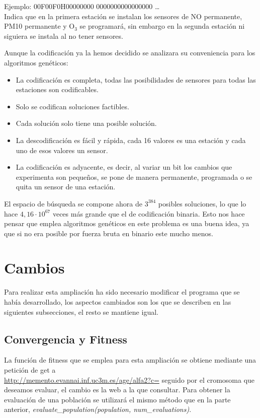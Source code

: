 \documentclass[12pt, spanish, pdftex]{UC3M_document}
\begin{document}
Ejemplo: 00F00F0H00000000 0000000000000000 … \\ Indica que en la primera estación se instalan los sensores de NO permanente, PM10 permanente y O$_3$ se programará, sin embargo en la segunda estación ni siguiera se instala al no tener sensores.

Aunque la codificación ya la hemos decidido se analizara su conveniencia para los algoritmos genéticos:
\begin{itemize}
	\item La codificación es completa, todas las posibilidades de sensores para todas las estaciones son codificables.
	\item Solo se codifican soluciones factibles.
	\item Cada solución solo tiene una posible solución.
	\item La descodificación es fácil y rápida, cada 16 valores es una estación y cada uno de esos valores un sensor.
	\item La codificación es adyacente, es decir, al variar un bit los cambios que experimenta son pequeños, se pone de manera permanente, programada o se quita un sensor de una estación.
\end{itemize}

El espacio de búsqueda se compone ahora de $3^{384}$ posibles soluciones, lo que lo hace $4,16 \cdot 10^{67}$ veces más grande que el de codificación binaria. Esto nos hace pensar que emplea algoritmos genéticos en este problema es una buena idea, ya que si no era posible por fuerza bruta en binario este mucho menos.

\section{Cambios}
Para realizar esta ampliación ha sido necesario modificar el programa que se había desarrollado, los aspectos cambiados son los que se describen en las siguientes subsecciones, el resto se mantiene igual.

\subsection{Convergencia y Fitness}
La función de fitness que se emplea para esta ampliación se obtiene mediante una petición de get a \\ \href{http://memento.evannai.inf.uc3m.es/age/alfa2?c=}{http://memento.evannai.inf.uc3m.es/age/alfa2?c=} seguido por el cromosoma que deseamos evaluar, el cambio es la web a la que consultar. Para obtener la evaluación de una población se utilizará el mismo método que en la parte anterior, \textit{evaluate\_population(population, num\_evaluations)}.
\end{document}
